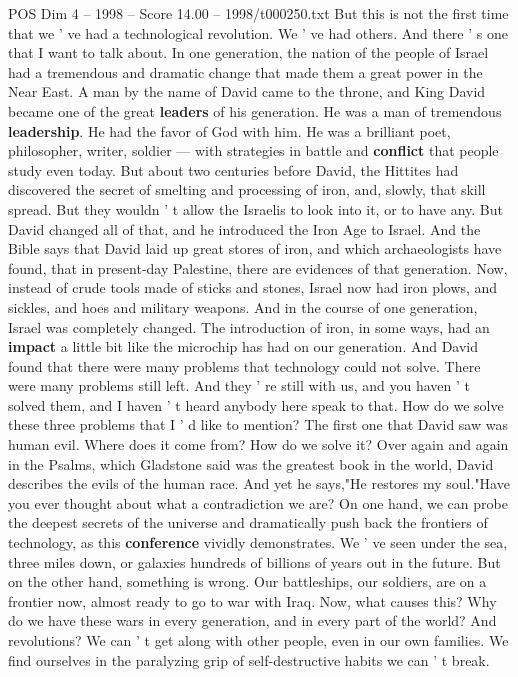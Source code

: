 \begin{textsample}{POS Dim 4 – 1998 – Score 14.00 – 1998/t000250.txt}
But this is not the first time that we ' ve had a technological revolution.
We ' ve had others.
And there ' s one that I want to talk about.
In one generation, the nation of the people of Israel had a tremendous and dramatic change that made them a great power in the Near East.
A man by the name of David came to the throne, and King David became one of the great \textbf{leaders} of his generation.
He was a man of tremendous \textbf{leadership}.
He had the favor of God with him.
He was a brilliant poet, philosopher, writer, soldier — with strategies in battle and \textbf{conflict} that people study even today.
But about two centuries before David, the Hittites had discovered the secret of smelting and processing of iron, and, slowly, that skill spread.
But they wouldn ' t allow the Israelis to look into it, or to have any.
But David changed all of that, and he introduced the Iron Age to Israel.
And the Bible says that David laid up great stores of iron, and which archaeologists have found, that in present-day Palestine, there are evidences of that generation.
Now, instead of crude tools made of sticks and stones, Israel now had iron plows, and sickles, and hoes and military weapons.
And in the course of one generation, Israel was completely changed.
The introduction of iron, in some ways, had an \textbf{impact} a little bit like the microchip has had on our generation.
And David found that there were many problems that technology could not solve.
There were many problems still left.
And they ' re still with us, and you haven ' t solved them, and I haven ' t heard anybody here speak to that.
How do we solve these three problems that I ' d like to mention?
The first one that David saw was human evil.
Where does it come from?
How do we solve it?
Over again and again in the Psalms, which Gladstone said was the greatest book in the world, David describes the evils of the human race.
And yet he says,"He restores my soul."Have you ever thought about what a contradiction we are?
On one hand, we can probe the deepest secrets of the universe and dramatically push back the frontiers of technology, as this \textbf{conference} vividly demonstrates.
We ' ve seen under the sea, three miles down, or galaxies hundreds of billions of years out in the future.
But on the other hand, something is wrong.
Our battleships, our soldiers, are on a frontier now, almost ready to go to war with Iraq.
Now, what causes this?
Why do we have these wars in every generation, and in every part of the world?
And revolutions?
We can ' t get along with other people, even in our own families.
We find ourselves in the paralyzing grip of self-destructive habits we can ' t break.

\end{textsample}

